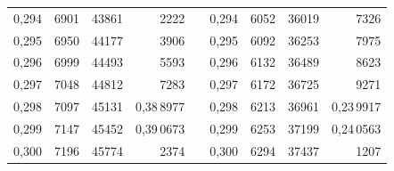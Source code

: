 \begin{tabular}{|c|c|c|r|@{}p{9pt}@{}|c|c|c|r|}
0,294 & 6901 & 43861 & 2222 &  & 0,294 & 6052 & 36019 & 7326 \\
0,295 & 6950 & 44177 & 3906 &  & 0,295 & 6092 & 36253 & 7975 \\[3pt]
0,296 & 6999 & 44493 & 5593 &  & 0,296 & 6132 & 36489 & 8623 \\
0,297 & 7048 & 44812 & 7283 &  & 0,297 & 6172 & 36725 & 9271 \\
0,298 & 7097 & 45131 & 0,38\,8977 &  & 0,298 & 6213 & 36961 & 0,23\,9917 \\
0,299 & 7147 & 45452 & 0,39\,0673 &  & 0,299 & 6253 & 37199 & 0,24\,0563 \\
0,300 & 7196 & 45774 & 2374 &  & 0,300 & 6294 & 37437 & 1207 \\
\hline
\end{tabular}\par
\endgroup
